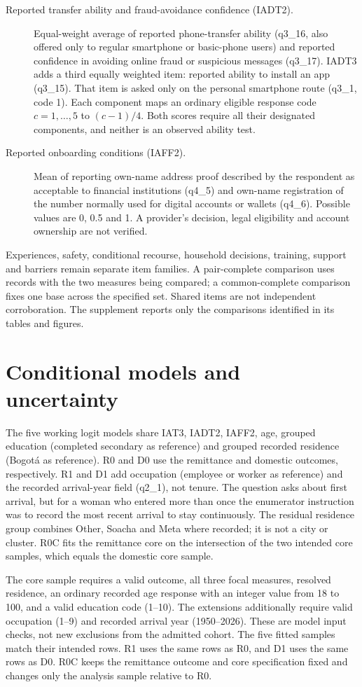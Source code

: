 \begin{description}
\item[Reported transfer ability and fraud-avoidance confidence (IADT2).] Equal-weight average of reported phone-transfer ability (q3\_16, also offered only to regular smartphone or basic-phone users) and reported confidence in avoiding online fraud or suspicious messages (q3\_17). IADT3 adds a third equally weighted item: reported ability to install an app (q3\_15). That item is asked only on the personal smartphone route (q3\_1, code 1). Each component maps an ordinary eligible response code \(c=1,\ldots,5\) to \((c-1)/4\). Both scores require all their designated components, and neither is an observed ability test.
\item[Reported onboarding conditions (IAFF2).] Mean of reporting own-name address proof described by the respondent as acceptable to financial institutions (q4\_5) and own-name registration of the number normally used for digital accounts or wallets (q4\_6). Possible values are 0, 0.5 and 1. A provider's decision, legal eligibility and account ownership are not verified.
\end{description}
Experiences, safety, conditional recourse, household decisions, training, support and barriers remain separate item families. A pair-complete comparison uses records with the two measures being compared; a common-complete comparison fixes one base across the specified set. Shared items are not independent corroboration. The supplement reports only the comparisons identified in its tables and figures.

\section{Conditional models and uncertainty}
The five working logit models share IAT3, IADT2, IAFF2, age, grouped education (completed secondary as reference) and grouped recorded residence (Bogotá as reference). R0 and D0 use the remittance and domestic outcomes, respectively. R1 and D1 add occupation (employee or worker as reference) and the recorded arrival-year field (q2\_1), not tenure. The question asks about first arrival, but for a woman who entered more than once the enumerator instruction was to record the most recent arrival to stay continuously. The residual residence group combines Other, Soacha and Meta where recorded; it is not a city or cluster. R0C fits the remittance core on the intersection of the two intended core samples, which equals the domestic core sample.

The core sample requires a valid outcome, all three focal measures, resolved residence, an ordinary recorded age response with an integer value from 18 to 100, and a valid education code (1--10). The extensions additionally require valid occupation (1--9) and recorded arrival year (1950--2026). These are model input checks, not new exclusions from the admitted cohort. The five fitted samples match their intended rows. R1 uses the same rows as R0, and D1 uses the same rows as D0. R0C keeps the remittance outcome and core specification fixed and changes only the analysis sample relative to R0.

